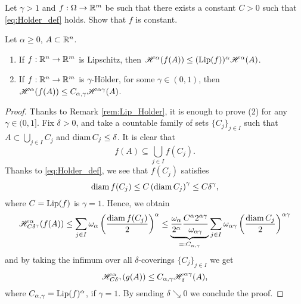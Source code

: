 \begin{exercise}
Let $\gamma > 1$ and $f: \Omega \to \mathbb{R}^{m}$ be such that there exists a constant $C > 0$ such that \eqref{eq:Holder_def} holds. Show that $f$ is constant.
\end{exercise}

\begin{proposition}
Let $\alpha \geq 0$, $A \subset \mathbb{R}^n$.
\begin{enumerate}[(1)]
\item If $f : \mathbb{R}^n \to \mathbb{R}^m$ is Lipschitz, then $\mathscr{H}^{\alpha}(f(A)) \leq
(\operatorname{Lip}(f))^\alpha \mathscr{H}^{\alpha}(A)$.
\item If $f : \mathbb{R}^n \to \mathbb{R}^m$ is $\gamma$-H\"older, for some $\gamma \in (0, 1)$, then $\mathscr{H}^{\alpha}(f(A)) \leq
C_{\alpha,\gamma} \mathscr{H}^{\alpha \gamma}(A)$.
\end{enumerate}
\end{proposition}

\begin{proof}
Thanks to Remark \ref{rem:Lip_Holder}, it is enough to prove (2) for any $\gamma \in (0, 1]$. Fix $\delta > 0$, and take a countable family of sets $\{C_j\}_{j\in I}$
such that $A \subset \bigcup_{j\in I} C_j$ and $\operatorname{diam} C_j \leq \delta$. It is clear that
$$f(A) \subseteq \bigcup_{j\in I} f(C_j).$$
Thanks to \eqref{eq:Holder_def}, we see that $f(C_j)$ satisfies
\begin{equation*}
\operatorname{diam} f(C_j)\leq C \left(\operatorname{diam} C_j\right)^\gamma \leq C \delta^\gamma,
\end{equation*}
where $C = \operatorname{Lip}(f)$ is $\gamma = 1$.
Hence, we obtain
\[
\begin{aligned}
\mathscr{H}^{\alpha}_{C \delta^\gamma}(f(A)) \leq \sum_{j\in I} \omega_\alpha
\left(\frac{\operatorname{diam} f(C_j)}{2}\right)^\alpha
\leq 
\underbrace{\frac{\omega_\alpha}{2^\alpha} \frac{C^\alpha
2^{\alpha\gamma}}{\omega_{\alpha\gamma}}}_{=: C_{\alpha,\gamma}} \sum_{j\in I} \omega_{\alpha \gamma} 
\left(\frac{\operatorname{diam} C_j}{2}\right)^{\alpha\gamma}
\end{aligned}
\]
and by taking the infimum over all $\delta$-coverings $\{C_j\}_{j\in I}$ we get
\[
\mathscr{H}^{\alpha}_{C\delta^\gamma} (g(A)) \leq C_{\alpha,\gamma}
\mathscr{H}^{\alpha\gamma}_\delta (A),
\]
where $C_{\alpha, \gamma} = \operatorname{Lip}(f)^{\alpha}$, if $\gamma = 1$.
By sending $\delta \searrow 0$ we conclude the proof.
\end{proof}

